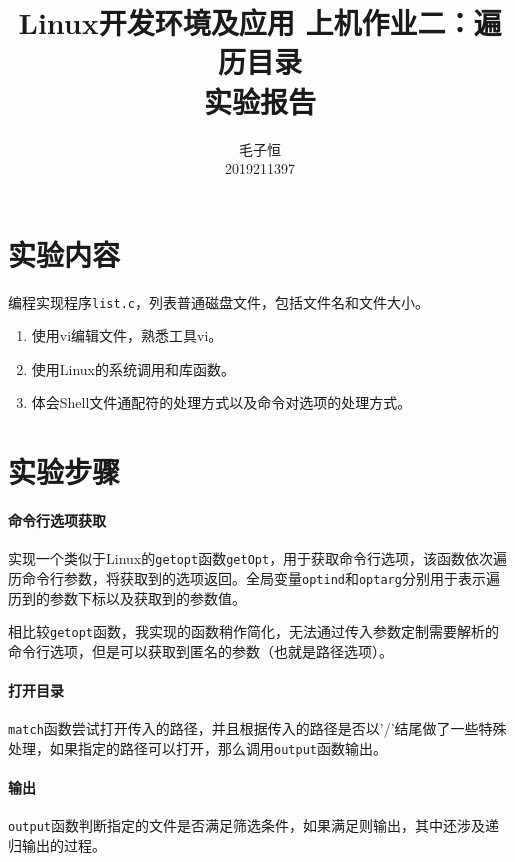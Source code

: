 \documentclass[lang=cn,11pt,a4paper,cite=authornum]{paper}
\title{Linux开发环境及应用 上机作业二：遍历目录 \\ 实验报告}
\author{毛子恒 \\ 2019211397}
\institute{北京邮电大学\ 计算机学院}
\date{\zhtoday}
\begin{document}
\maketitle

\section{实验内容}

编程实现程序\texttt{list.c}，列表普通磁盘文件，包括文件名和文件大小。

\begin{enumerate}
    \item 使用vi编辑文件，熟悉工具vi。
    \item 使用Linux的系统调用和库函数。
    \item 体会Shell文件通配符的处理方式以及命令对选项的处理方式。
\end{enumerate}

\section{实验步骤}

\paragraph{命令行选项获取}

实现一个类似于Linux的\texttt{getopt}函数\texttt{getOpt}，用于获取命令行选项，该函数依次遍历命令行参数，将获取到的选项返回。全局变量\texttt{optind}和\texttt{optarg}分别用于表示遍历到的参数下标以及获取到的参数值。

相比较\texttt{getopt}函数，我实现的函数稍作简化，无法通过传入参数定制需要解析的命令行选项，但是可以获取到匿名的参数（也就是路径选项）。

\paragraph{打开目录}

\texttt{match}函数尝试打开传入的路径，并且根据传入的路径是否以'/'结尾做了一些特殊处理，如果指定的路径可以打开，那么调用\texttt{output}函数输出。

\paragraph{输出}

\texttt{output}函数判断指定的文件是否满足筛选条件，如果满足则输出，其中还涉及递归输出的过程。
\end{document}
